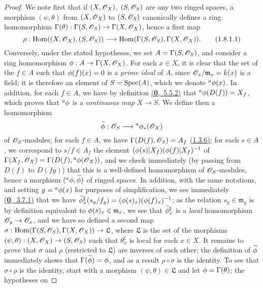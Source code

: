 \begin{proof}
\label{proof-prop-1.1.8.1}
We note first that if $(X,\mathscr{O}_X)$, $(S,\mathscr{O}_S)$ are any two ringed spaces, a morphism
$(\psi,\theta)$ from $(X,\mathscr{O}_X)$ to $(S,\mathscr{O}_S)$ canonically defines a ring homomorphism
$\Gamma(\theta):\Gamma(S,\mathscr{O}_S)\to\Gamma(X,\mathscr{O}_X)$, hence a first map
\[
  \rho:{\mathop{\mathrm{Hom}}\nolimits}((X,\mathscr{O}_X),(S,\mathscr{O}_S))\longrightarrow{\mathop{\mathrm{Hom}}\nolimits}(\Gamma(S,\mathscr{O}_S),\Gamma(X,\mathscr{O}_X)).
  \tag{1.8.1.1}
\]
Conversely, under the stated hypotheses, we set $A=\Gamma(S,\mathscr{O}_S)$, and consider a ring
homomorphism $\phi:A\to\Gamma(X,\mathscr{O}_X)$. For each $x\in X$, it is clear that the set of the
$f\in A$ such that $\phi(f)(x)=0$ is a {\it prime ideal} of $A$, since
$\mathscr{O}_x/\mathfrak{m}_x=k(x)$ is a field; it is therefore an element of $S={\mathop{\mathrm{Spec}}\nolimits}(A)$, which
we denote ${}^a\phi(x)$. In addition, for each $f\in A$, we have by definition
\hyperref[env-0.5.5.2]{(\textbf{0},~5.5.2)} that ${}^a\phi(D(f))=X_f$, which proves that ${}^a\phi$ is a
{\it continuous map} $X\to S$. We define then a homomorphism
\[
  \widetilde{\phi}:\mathscr{O}_S\longrightarrow{}^a\phi_*(\mathscr{O}_X)
\]
of $\mathscr{O}_S$-modules; for each $f\in A$, we have $\Gamma(D(f),\mathscr{O}_S)=A_f$ \hyperref[prop-1.1.3.6]{(1.3.6)};
for each $s\in A$, we correspond to $s/f\in A_f$ the element
$(\phi(s)|X_f)(\phi(f)|X_f)^{-1}$ of $\Gamma(X_f,\mathscr{O}_X)=\Gamma(D(f),{}^a\phi(\mathscr{O}_X))$, and
we check immediately (by passing from $D(f)$ to $D(fg)$) that this is a well-defined
homomorphism of $\mathscr{O}_S$-modules, hence a morphism $({}^a\phi,\widetilde{\phi})$ of ringed
spaces. In addition, with the same notations, and setting $y={}^a\phi(x)$ for purposes of
simplification, we see immediately \hyperref[env-0.3.7.1]{(\textbf{0},~3.7.1)} that we have
$\widetilde{\phi}_x^\sharp(s_y/f_y)=(\phi(s)_x)(\phi(f)_x)^{-1}$; as the relation
$s_y\in\mathfrak{m}_y$ is by definition equivalent to $\phi(s)_x\in\mathfrak{m}_x$, we see
that $\widetilde{\phi}_x^\sharp$ is a {\it local} homomorphism $\mathscr{O}_y\to\mathscr{O}_x$, and we have
so defined a second map $\sigma:{\mathop{\mathrm{Hom}}\nolimits}(\Gamma(S,\mathscr{O}_S),\Gamma(X,\mathscr{O}_X))\to\mathfrak{L}$, where
$\mathfrak{L}$ is the set of the morphisms $(\psi,\theta):(X,\mathscr{O}_X)\to(S,\mathscr{O}_S)$ such that
$\theta_x^\sharp$ is local for each $x\in X$. It remains to prove that $\sigma$ and $\rho$
(restricted to $\mathfrak{L}$) are inverses of each other; the definition of
$\widetilde{\phi}$ immediately shows that $\Gamma(\widetilde{\phi})=\phi$, and as a result
$\rho\circ\sigma$ is the identity. To see that $\sigma\circ\rho$ is the identity, start with a
morphism $(\psi,\theta)\in\mathfrak{L}$ and let $\phi=\Gamma(\theta)$; the hypotheses on

\end{proof}
